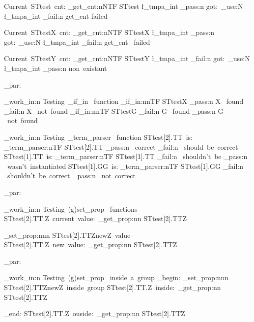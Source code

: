 \documentclass{article}
\begin{document}


Current~STtest~cnt: 
\starray_get_cnt:nNTF {STtest} \l_tmpa_int 
  {\sttests_pass:n {got:~\int_use:N \l_tmpa_int}}
  {\sttests_fail:n {get_cnt failed}}

Current~STtestX~cnt: 
\starray_get_cnt:nNTF {STtestX} \l_tmpa_int 
  {\sttests_pass:n {got:~\int_use:N \l_tmpa_int}}
  {\sttests_fail:n {get_cnt~ failed}}


Current~STtestY~cnt: 
\starray_get_cnt:nNTF {STtestY} \l_tmpa_int 
  {\sttests_fail:n {got:~\int_use:N \l_tmpa_int}}
  {\sttests_pass:n {non~existant}}

\sttests_par:

\sttests_work_in:n {Testing~_if_in ~function}
\starray_if_in:nnTF {STtest}{X}
  {\sttests_pass:n {X ~found}}
  {\sttests_fail:n {X ~not~found}}
\starray_if_in:nnTF {STtest}{G}
  {\sttests_fail:n {G ~found}}
  {\sttests_pass:n {G ~not~found}}

\sttests_work_in:n {Testing~_term_parser ~function}
STtest[2].TT~is:
\starray_term_parser:nTF {STtest[2].TT}
  {\sttests_pass:n {~correct}}
  {\sttests_fail:n {~should~be~correct}}
STtest[1].TT~is:
\starray_term_parser:nTF {STtest[1].TT}
  {\sttests_fail:n {~shouldn't~be}}
  {\sttests_pass:n {~wasn't~instantiated}}
STtest[1].GG~is:
\starray_term_parser:nTF {STtest[1].GG}
  {\sttests_fail:n {~shouldn't~be~correct}}
  {\sttests_pass:n {~not~correct}}


\sttests_par:

\sttests_work_in:n {Testing~(g)set_prop ~functions}
STtest[2].TT.Z~current~value:~\starray_get_prop:nn {STtest[2].TT}{Z}\par
\starray_set_prop:nnn {STtest[2].TT}{Z}{newZ~value}
STtest[2].TT.Z~new~value:~\starray_get_prop:nn {STtest[2].TT}{Z}\par

\sttests_par:

\sttests_work_in:n {Testing~(g)set_prop ~inside~a~group}
\group_begin:
  \starray_set_prop:nnn {STtest[2].TT}{Z}{newZ~inside~group}
  STtest[2].TT.Z~inside:~\starray_get_prop:nn {STtest[2].TT}{Z}\par
\group_end:
  STtest[2].TT.Z~ouside:~\starray_get_prop:nn {STtest[2].TT}{Z}\par
\end{document}
